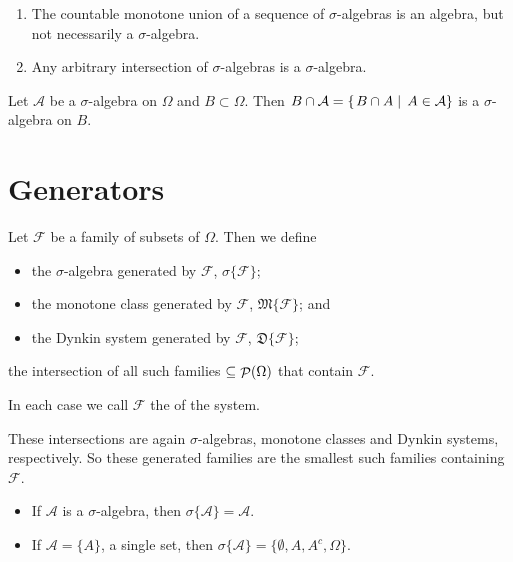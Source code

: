 \begin{lemma}
\begin{enumerate}
\item The countable monotone union of a sequence of $\sigma$-algebras is an algebra, but not necessarily a $\sigma$-algebra.
\item Any arbitrary intersection of $\sigma$-algebras is a $\sigma$-algebra.
\end{enumerate}
\end{lemma}

\begin{lemma}
Let $\mathcal{A}$ be a $\sigma$-algebra on $\Omega$ and $B\subset \Omega$. Then $B\cap \mathcal{A} = \left\{\left. B\cap A \;\right|\; A\in\mathcal{A} \right\}$ is a $\sigma$-algebra on $B$.
\end{lemma}

\section{Generators}
\begin{definition}
Let $\mathcal{F}$ be a family of subsets of $\Omega$. Then we define
\begin{itemize}
\item the $\sigma$-algebra generated by $\mathcal{F}$, $\sigma\{\mathcal{F}\}$;
\item the monotone class generated by $\mathcal{F}$, $\mathfrak{M}\{\mathcal{F}\}$; and
\item the Dynkin system generated by $\mathcal{F}$, $\mathfrak{D}\{\mathcal{F}\}$;
\end{itemize}
the intersection of all such families $\subseteq \mathop{\mathcal{P}}(\Omega)$ that contain $\mathcal{F}$.

In each case we call $\mathcal{F}$ the  of the system.
\end{definition}
These intersections are again $\sigma$-algebras, monotone classes and Dynkin systems, respectively. So these generated families are the smallest such families containing $\mathcal{F}$.

\begin{example}
\begin{itemize}
\item If $\mathcal{A}$ is a $\sigma$-algebra, then $\sigma\{\mathcal{A}\} = \mathcal{A}$.
\item If $\mathcal{A} = \{A\}$, a single set, then $\sigma\{\mathcal{A}\} = \{\emptyset, A,A^c,\Omega\}$.
\end{itemize}
\end{example}

